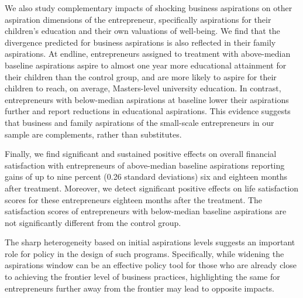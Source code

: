 \documentclass[11.5pt]{article}
\begin{document}
We also study complementary impacts of shocking business aspirations on other aspiration dimensions of the entrepreneur, specifically aspirations for their children's education and their own valuations of well-being. We find that the divergence predicted for business aspirations is also reflected in their family aspirations. At endline, entrepreneurs assigned to treatment with above-median baseline aspirations aspire to almost one year more educational attainment for their children than the control group, and are more likely to aspire for their children to reach, on average, Masters-level university education. In contrast, entrepreneurs with below-median aspirations at baseline lower their aspirations further and report reductions in educational aspirations. This evidence suggests that business and family aspirations of the small-scale entrepreneurs in our sample are complements, rather than substitutes.

Finally, we find significant and sustained positive effects on overall financial satisfaction with entrepreneurs of above-median baseline aspirations reporting gains of up to nine percent (0.26 standard deviations) six and eighteen months after treatment. Moreover, we detect significant positive effects on life satisfaction scores for these entrepreneurs eighteen months after the treatment. The satisfaction scores of entrepreneurs with below-median baseline aspirations are not significantly different from the control group.


The sharp heterogeneity based on initial aspirations levels suggests an important role for policy in the design of such programs. Specifically, while widening the aspirations window can be an effective policy tool for those who are already close to achieving the frontier level of business practices, highlighting the same for entrepreneurs further away from the frontier may lead to opposite impacts.
\end{document}
